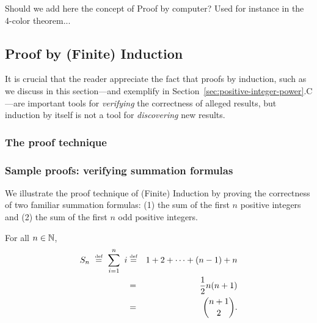 {\Denis Should we add here the concept of Proof by computer?
Used for instance in the 4-color theorem...}





\subsection{Proof by (Finite) Induction}
\label{sec:Induction}

It is crucial that the reader appreciate the fact that proofs by
induction, such as we discuss in this section---and exemplify in
Section~\ref{sec:positive-integer-power}.C---are important tools for
{\em verifying} the correctness of alleged results, but induction by
itself is not a tool for {\em discovering} new results.


\subsubsection{The proof technique}


\subsubsection{Sample proofs: verifying summation formulas}
\label{sec:Proof-Induction}


We illustrate the proof technique of (Finite) Induction by proving the
correctness of two familiar summation formulas: (1) the sum of the
first $n$ positive integers and (2) the sum of the first $n$ odd
positive integers.

\begin{prop}
\label{thm:sum-1-to-n-induction1}
For all $n \in \mathbb{N}$,
\begin{eqnarray}
\nonumber
S_n \ \stackrel{\mbox{{\tiny def}}}{=} \ \sum_{i=1}^n \ i
 & \stackrel{\mbox{{\tiny def}}}{=} &
 1 + 2 + \cdots + (n-1) + n \\
\label{eq:sum-first-n1}
 & = & {1 \over 2} n (n+1) \\
\nonumber
 & = & {{n+1}  \choose 2}.
\end{eqnarray}
\end{prop}

